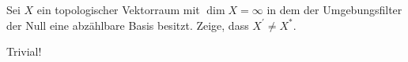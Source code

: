 \begin{exercise}

Sei $X$ ein topologischer Vektorraum mit $\dim{X} = \infty$ in dem der Umgebungsfilter der Null eine abzählbare Basis besitzt.
Zeige, dass $X^\prime \neq X^\ast$.

\end{exercise}

\begin{solution}

Trivial!

\end{solution}
